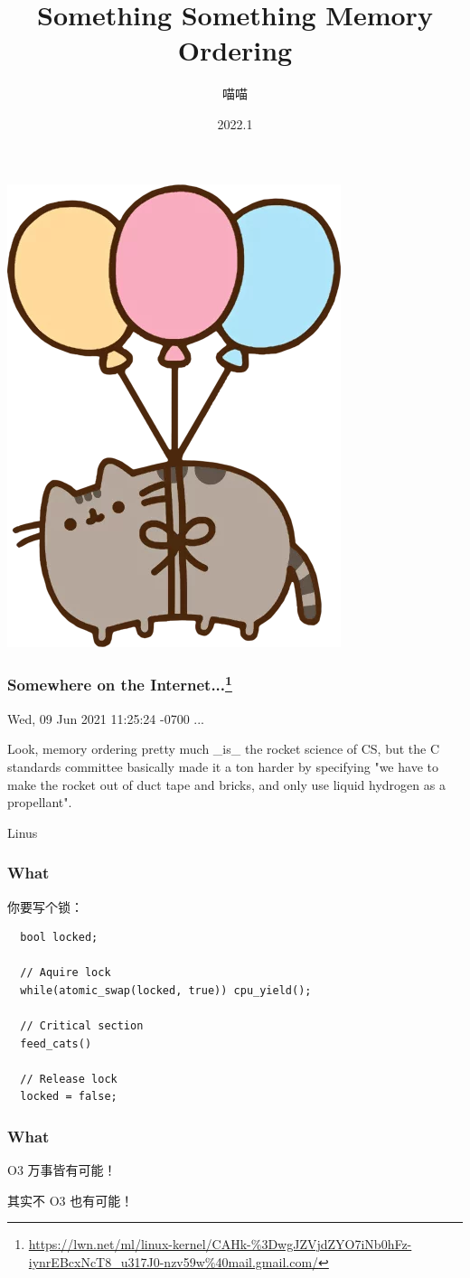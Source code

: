 \documentclass[UTF-8]{ctexbeamer}
\title{Something Something Memory Ordering}
\author{喵喵}
\date{2022.1}
\begin{document}
\begin{frame}
  \titlepage
  \begin{center}
    \includegraphics[width=.1\textwidth]{assets/float.png}
  \end{center}
\end{frame}

\begin{frame}
  \frametitle{Somewhere on the Internet...\footnote{\url{https://lwn.net/ml/linux-kernel/CAHk-\%3DwgJZVjdZYO7iNb0hFz-iynrEBcxNcT8\_u317J0-nzv59w\%40mail.gmail.com/}}}

  \begin{block}{Wed, 09 Jun 2021 11:25:24 -0700}
...

\vspace{1em}

Look, memory ordering pretty much \_is\_ the rocket science of CS, but
the C standards committee basically made it a ton harder by specifying
"we have to make the rocket out of duct tape and bricks, and only use
liquid hydrogen as a propellant".

\vspace{1em}

\pause

Linus
  \end{block}
\end{frame}

\begin{frame}[fragile]
  \frametitle{What}

  你要写个锁：

  \begin{verbatim}
  bool locked;

  // Aquire lock
  while(atomic_swap(locked, true)) cpu_yield();

  // Critical section
  feed_cats()

  // Release lock
  locked = false;
  \end{verbatim}
\end{frame}

\begin{frame}
  \frametitle{What}

  O3 万事皆有可能！
  \pause

  {
    \tiny
  其实不 O3 也有可能！
  }

\end{frame}
\end{document}
